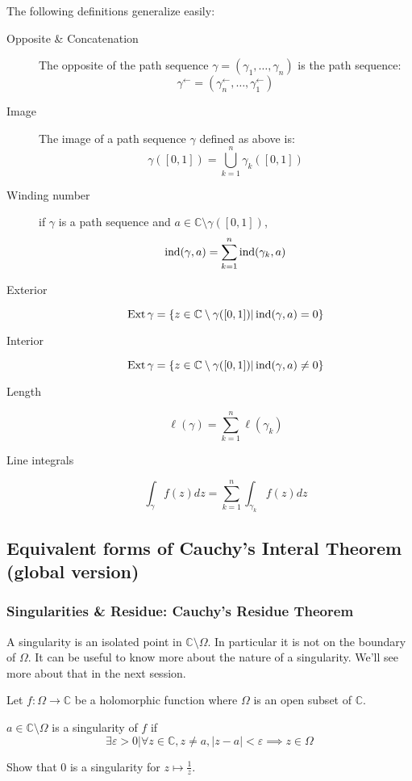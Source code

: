 \begin{defi}
    The following definitions generalize easily:

    \begin{description}
        \item[Opposite \& Concatenation] The opposite of the path sequence $\gamma = (\gamma_1, \dots, \gamma_n)$ is the path sequence:
            $$\gamma^\leftarrow  = (\gamma_n^\leftarrow, \dots, \gamma_1^\leftarrow)$$
        \item[Image] The image of a path sequence $\gamma$ defined as above is:
            $$ \gamma([0,1]) = \bigcup_{k=1}^n{\gamma_k([0,1])} $$
        \item[Winding number] if $\gamma$ is a path sequence and $a\in\mathbb{C}\setminus\gamma([0,1])$,
            $$\operatorname{ind}(\gamma, a) = \sum_{k=1}^n\operatorname{ind}(\gamma_k, a)$$

        \item[Exterior] 
            $$\operatorname{Ext}\gamma = \left\lbrace z\in\mathbb{C}\setminus\gamma([0,1]) \vert \operatorname{ind}(\gamma, a) = 0 \right\rbrace$$
        \item[Interior] 
            $$\operatorname{Ext}\gamma = \left\lbrace z\in\mathbb{C}\setminus\gamma([0,1]) \vert \operatorname{ind}(\gamma, a) \neq 0 \right\rbrace$$
        \item[Length] 
            $$\ell(\gamma) = \sum_{k=1}^n \ell(\gamma_k)$$
        \item[Line integrals]
            $$\int_\gamma f(z)dz = \sum_{k=1}^n \int_{\gamma_k}f(z)dz$$
    \end{description}
\end{defi}

\subsection{Equivalent forms of Cauchy's Interal Theorem (global version)}


\subsubsection{Singularities \& Residue: Cauchy's Residue Theorem}

A singularity is an isolated point in $\mathbb{C}\setminus\Omega$. In particular it is not on the boundary of $\Omega$. It can be useful to know more about the nature of a singularity. We'll see more about that in the next session.

\begin{defi}[Singularity]
    Let $f: \Omega \rightarrow \mathbb{C}$ be a holomorphic function where $\Omega$ is an open subset of $\mathbb{C}$.
    
    $a\in\mathbb{C}\setminus\Omega$ is a singularity of $f$ if
    $$ \exists \varepsilon > 0 \vert \forall z\in\mathbb{C}, z \neq a, |z-a| < \varepsilon \implies z\in\Omega$$
    
\end{defi}
\begin{example}[$\star$]
    Show that $0$ is a singularity for $z \mapsto \frac{1}{z}$.
\end{example}


